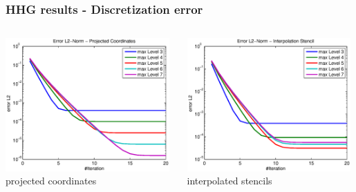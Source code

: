 \documentclass[t,compress=false,usepdftitle=false]{beamer}
\begin{document}
%
%
\begin{frame}\frametitle{HHG results - Discretization error}

\begin{columns}[T] 
\begin{column}[T]{5.8cm} 
  \centering
  \includegraphics[width=0.98\textwidth]{spherepoisson_errorEuc_ProjCoords}\\
  projected coordinates
\end{column}\hfill
\begin{column}[T]{5.8cm} 
  \centering
  \includegraphics[width=0.98\textwidth]{spherepoisson_errorEuc_InterpolationStencil}\\
  interpolated stencils
\end{column}
\end{columns}
\vspace{0.5cm}
\centering

\end{frame}
\end{document}
